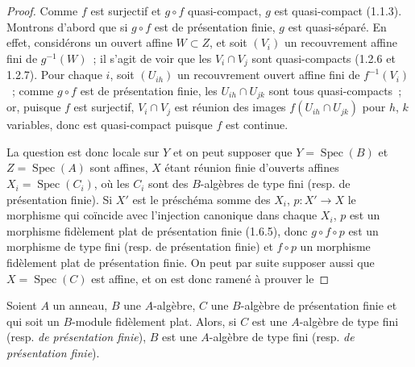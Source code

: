 \begin{proof}
Comme $f$ est surjectif et $g\circ f$ quasi-compact, $g$ est quasi-compact
(1.1.3). Montrons d'abord que si $g\circ f$ est de présentation finie, $g$ est
quasi-séparé. En effet, considérons un ouvert affine $W\subset Z$, et soit
$(V_i)$ un recouvrement affine fini de $g^{-1}(W)$~; il s'agit de voir que les
$V_i\cap V_j$ sont quasi-compacts (1.2.6 et 1.2.7). Pour chaque $i$, soit
$(U_{ih})$ un recouvrement ouvert affine fini de $f^{-1}(V_i)$~; comme $g\circ f$ est
de présentation finie, les $U_{ih}\cap U_{jk}$ sont tous quasi-compacts~; or,
puisque $f$ est surjectif, $V_i\cap V_j$ est réunion des images
$f(U_{ih}\cap U_{jk})$ pour $h$, $k$ variables, donc est quasi-compact puisque
$f$ est continue.

La question est donc locale sur $Y$ et on peut supposer que
$Y=\operatorname{Spec}(B)$ et $Z=\operatorname{Spec}(A)$ sont affines, $X$
étant réunion finie d'ouverts affines $X_i=\operatorname{Spec}(C_i)$, où les
$C_i$ sont des $B$-algèbres de type fini (resp. de présentation finie). Si
$X'$ est le préschéma somme des $X_i$, $p:X'\to X$ le morphisme qui coïncide
avec l'injection canonique dans chaque $X_i$, $p$ est un morphisme fidèlement
plat de présentation finie (1.6.5), donc $g\circ f\circ p$ est un morphisme de
type fini (resp. de présentation finie) et $f\circ p$ un morphisme fidèlement
plat de présentation finie. On peut par suite supposer aussi que
$X=\operatorname{Spec}(C)$ est affine, et on est donc ramené à prouver le
\end{proof}

\begin{corollary}[11.3.17]
\label{IV.11.3.17-fr}
Soient $A$ un anneau, $B$ une $A$-algèbre, $C$ une $B$-algèbre de présentation
finie et qui soit un $B$-module fidèlement plat. Alors, si $C$ est une
$A$-algèbre de type fini \textup{(resp. \emph{de présentation finie})}, $B$ est une
$A$-algèbre de type fini \textup{(resp. \emph{de présentation finie})}.
\end{corollary}

